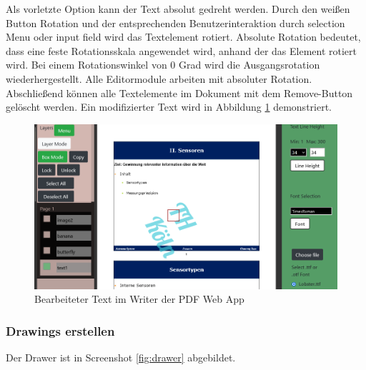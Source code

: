 Als vorletzte Option kann der Text absolut gedreht werden. Durch den weißen Button Rotation und der entsprechenden Benutzerinteraktion durch selection Menu oder input field wird das Textelement rotiert. Absolute Rotation bedeutet, dass eine feste Rotationsskala angewendet wird, anhand der das Element rotiert wird. Bei einem Rotationswinkel von 0 Grad wird die Ausgangsrotation wiederhergestellt. Alle Editormodule arbeiten mit absoluter Rotation. Abschließend können alle Textelemente im Dokument mit dem Remove-Button gelöscht werden. Ein modifizierter Text wird in Abbildung \ref{fig:text} demonstriert.

\begin{figure}[!htbp]
	\centering
	\includegraphics[width=1\textwidth]{"images/text.png"}
	\caption{Bearbeiteter Text im Writer der PDF Web App}
	\label{fig:text}
\end{figure}

\subsubsection{Drawings erstellen}
Der Drawer ist in Screenshot \ref{fig:drawer} abgebildet. 

